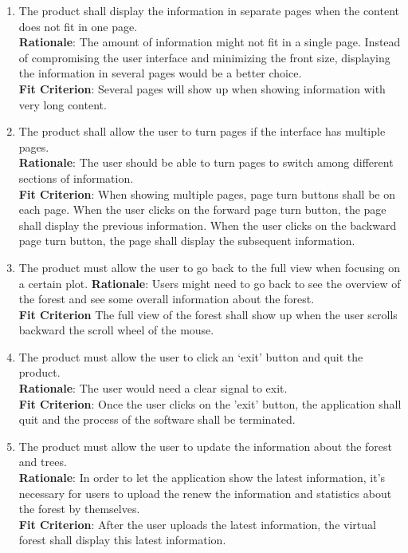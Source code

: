\documentclass{article}
\begin{document}
\begin{enumerate}[FR1]
	\item The product shall display the information in separate pages when the content does not fit in one page.\\
	\textbf{Rationale}: The amount of information might not fit in a single page. Instead of compromising the user interface and minimizing the front size, displaying the information in several pages would be a better choice.\\
	\textbf{Fit Criterion}: Several pages will show up when showing information with very long content.
	
	\item The product shall allow the user to turn pages if the interface has multiple pages. \\
	\textbf{Rationale}: The user should be able to turn pages to switch among different sections of information.\\
	\textbf{Fit Criterion}: When showing multiple pages, page turn buttons shall be on each page. When the user clicks on the forward page turn button, the page shall display the previous information. When the user clicks on the backward page turn button, the page shall display the subsequent information.
	
	\item The product must allow the user to go back to the full view when focusing on a certain plot.
	\textbf{Rationale}: Users might need to go back to see the overview of the forest and see some overall information about the forest.  \\
	\textbf{Fit Criterion} The full view of the forest shall show up when the user scrolls backward the scroll wheel of the mouse.
	
	\item The product must allow the user to click an ‘exit’ button and quit the product.\\
	\textbf{Rationale}: The user would need a clear signal to exit.\\
	\textbf{Fit Criterion}: Once the user clicks on the 'exit' button, the application shall quit and the process of the software shall be terminated.
    
    \item The product must allow the user to update the information about the forest and trees.\\
	\textbf{Rationale}: In order to let the application show the latest information, it's necessary for users to upload the renew the information and statistics about the forest by themselves.\\
	\textbf{Fit Criterion}: After the user uploads the latest information, the virtual forest shall display this latest information. 
	

\end{enumerate}
\end{document}
